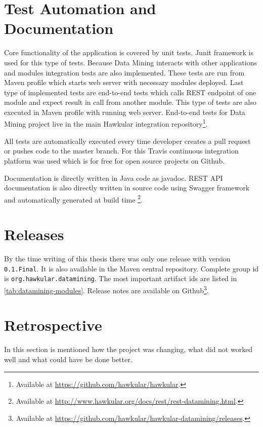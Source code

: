     \section{Test Automation and Documentation}
    Core functionality of the application is covered by unit tests. Junit framework is used for this type of tests.
    Because Data Mining interacts with other applications and modules integration tests are also implemented. These
    tests are run from Maven profile which starts web server with necessary modules deployed.
    Last type of implemented tests are end-to-end tests which calls REST endpoint of one module and expect result
    in call from another module. This type of tests are also executed in Maven profile with running web server.
    End-to-end tests for Data Mining project live in the main Hawkular integration repository\footnote{
    Available at \url{https://github.com/hawkular/hawkular}.}.

    All tests are automatically executed every time developer creates a pull request or pushes code to the master
    branch. For this Travis continuous integration platform was used which is for free for open source projects on
    Github.

    Documentation is directly written in Java code as javadoc. REST API documentation is also directly
    written in source code using Swagger framework and automatically generated at build time
    \footnote{Available at \url{http://www.hawkular.org/docs/rest/rest-datamining.html}.}.

    \section{Releases}
    By the time writing of this thesis there was only one release with version \texttt{0.1.Final}. It is also available
    in the Maven central repository. Complete group id is \texttt{org.hawkular.datamining}. The most important
    artifact ids are listed in \ref{tab:datamining-modules}. Release notes are available on
    Github\footnote{Available at \url{https://github.com/hawkular/hawkular-datamining/releases}.}.

    \section{Retrospective}
    In this section is mentioned how the project was changing, what did not worked well and what could have be done
    better.

